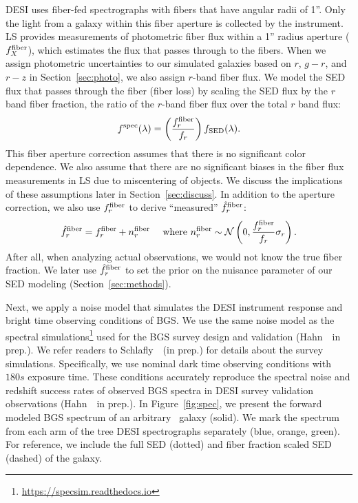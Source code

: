 DESI uses fiber-fed spectrographs with fibers that have angular radii of 1''. 
Only the light from a galaxy within this fiber aperture is collected by the 
instrument.
LS provides measurements of photometric fiber flux within a 1'' radius aperture
($f_X^{\rm fiber}$), which estimates the flux that passes through to the fibers.
When we assign photometric uncertainties to our simulated galaxies based on
$r$, $g-r$, and $r-z$ in Section~\ref{sec:photo}, we also assign $r$-band fiber
flux. 
We model the SED flux that passes through the fiber (fiber loss) by scaling the 
SED flux by the $r$ band fiber fraction, the ratio of the $r$-band fiber flux 
over the total $r$ band flux: 
\begin{equation}
    f^{\rm spec}(\lambda) = \left(\frac{f_r^{\rm fiber}}{f_r}\right)f_{\rm SED}(\lambda).
\end{equation}
This fiber aperture correction assumes that there is no significant color
dependence. 
We also assume that there are no significant biases in the fiber flux
measurements in LS due to miscentering of objects. 
We discuss the implications of these assumptions later in
Section~\ref{sec:discuss}. 
In addition to the aperture correction, we also use $f_r^{\rm fiber}$ to derive
``measured'' $\hat{f}_r^{\rm fiber}$: 
\begin{equation}
    \hat{f}_r^{\rm fiber} = f_r^{\rm fiber} + n^{\rm fiber}_r \quad~{\rm
    where}~n^{\rm fiber}_r \sim \mathcal{N}\left(0, \frac{f_r^{\rm fiber}}{f_r}
    \sigma_r\right).
\end{equation}
After all, when analyzing actual observations, we would not know the true fiber
fraction. 
We later use $\hat{f}_r^{\rm fiber}$ to set the prior on the nuisance parameter
of our SED modeling (Section~\ref{sec:methods}).

Next, we apply a noise model that simulates the DESI instrument response and
bright time observing conditions of BGS. 
We use the same noise model as the spectral 
simulations\footnote{\href{https://specsim.readthedocs.io/en/stable/guide.html}{https://specsim.readthedocs.io}} 
used for the BGS survey design and validation (Hahn~\etal~in prep.). 
We refer readers to Schlafly~\etal~(in prep.) for details about the survey
simulations. 
Specifically, we use nominal dark time observing conditions with $180s$
exposure time. 
These conditions accurately reproduce the spectral noise and redshift success
rates of observed BGS spectra in DESI survey validation observations 
(Hahn~\etal~in prep.).
In Figure~\ref{fig:spec}, we present the forward modeled BGS spectrum of an
arbitrary \lgal~galaxy (solid). 
We mark the spectrum from each arm of the tree DESI spectrographs separately 
(blue, orange, green).
For reference, we include the full SED (dotted) and fiber fraction scaled SED
(dashed) of the galaxy. 



